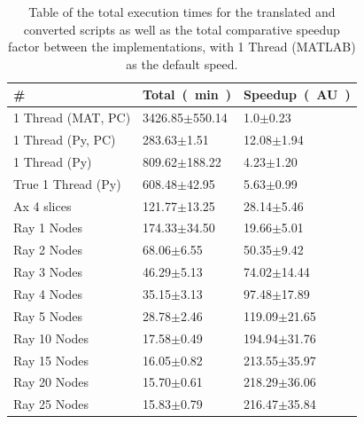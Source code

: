 \documentclass[12pt, a4paper]{article}
\begin{document}
\begin{table}[H]
    \centering
    \begin{tabular}{|l|l|l|}
    \hline
    \#                 & \SI[parse-numbers=false]{Total}{(\minute)}        & \SI[parse-numbers=false]{Speedup}{(AU)}       \\ \hline
    1 Thread (MAT, PC) & 3426.85$\pm$550.14 & 1.0$\pm$0.23     \\ \hline
    1 Thread (Py, PC)  & 283.63$\pm$1.51    & 12.08$\pm$1.94   \\ \hline
    1 Thread (Py)      & 809.62$\pm$188.22  & 4.23$\pm$1.20    \\ \hline
    True 1 Thread (Py) & 608.48$\pm$42.95   & 5.63$\pm$0.99    \\ \hline
    Ax 4 slices        & 121.77$\pm$13.25   & 28.14$\pm$5.46   \\ \hline
    Ray 1 Nodes        & 174.33$\pm$34.50   & 19.66$\pm$5.01   \\ \hline
    Ray 2 Nodes        & 68.06$\pm$6.55     & 50.35$\pm$9.42   \\ \hline
    Ray 3 Nodes        & 46.29$\pm$5.13     & 74.02$\pm$14.44  \\ \hline
    Ray 4 Nodes        & 35.15$\pm$3.13     & 97.48$\pm$17.89  \\ \hline
    Ray 5 Nodes        & 28.78$\pm$2.46     & 119.09$\pm$21.65 \\ \hline
    Ray 10 Nodes       & 17.58$\pm$0.49     & 194.94$\pm$31.76 \\ \hline
    Ray 15 Nodes       & 16.05$\pm$0.82     & 213.55$\pm$35.97 \\ \hline
    Ray 20 Nodes       & 15.70$\pm$0.61     & 218.29$\pm$36.06 \\ \hline
    Ray 25 Nodes       & 15.83$\pm$0.79     & 216.47$\pm$35.84 \\ \hline
    \end{tabular}

    \caption{Table of the total execution times for the translated and converted scripts as well as the total comparative speedup factor between the implementations, with 1 Thread (MATLAB) as the default speed.}
    \label{TotTime}
\end{table}
\end{document}
